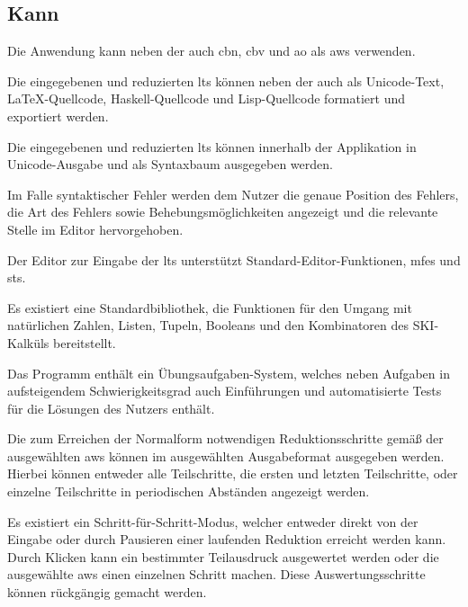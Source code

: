 \documentclass[parskip=full,11pt,twoside]{scrartcl}
\begin{document}

\subsection{Kann}

Die Anwendung kann neben der  auch \gls{cbn}, \gls{cbv}
und \gls{ao} als \gls{aws} verwenden.

Die eingegebenen und reduzierten \glspl{lt} können neben der 
auch als Unicode-Text, \LaTeX-Quellcode, Haskell-Quellcode und Lisp-Quellcode formatiert und exportiert
werden.

Die eingegebenen und reduzierten \glspl{lt} können innerhalb der Applikation in Unicode-Ausgabe und als Syntaxbaum
ausgegeben werden.

Im Falle syntaktischer Fehler werden dem Nutzer die genaue Position des Fehlers, die
Art des Fehlers sowie Behebungsmöglichkeiten angezeigt und die relevante Stelle im
Editor hervorgehoben.

Der Editor zur Eingabe der \glspl{lt} unterstützt Standard-Editor-Funktionen,
\glspl{mfe} und \glspl{st}.

Es existiert eine Standardbibliothek, die Funktionen für den Umgang mit natürlichen
Zahlen, Listen,  Tupeln, Booleans und den Kombinatoren des SKI-Kalküls bereitstellt.

Das Programm enthält ein Übungsaufgaben-System, welches neben Aufgaben in aufsteigendem
Schwierigkeitsgrad auch Einführungen und automatisierte Tests für die Lösungen des Nutzers
enthält.

Die zum Erreichen der Normalform notwendigen Reduktionsschritte gemäß der ausgewählten
\gls{aws} können im ausgewählten Ausgabeformat ausgegeben werden. Hierbei
können entweder alle Teilschritte, die ersten und letzten Teilschritte, oder
einzelne Teilschritte in periodischen Abständen angezeigt werden.

Es existiert ein Schritt-für-Schritt-Modus, welcher entweder direkt von der Eingabe
oder durch Pausieren einer laufenden Reduktion erreicht werden kann.
Durch Klicken kann ein bestimmter Teilausdruck ausgewertet werden oder die ausgewählte
\gls{aws} einen einzelnen Schritt machen. Diese Auswertungsschritte können rückgängig
gemacht werden.
\end{document}
